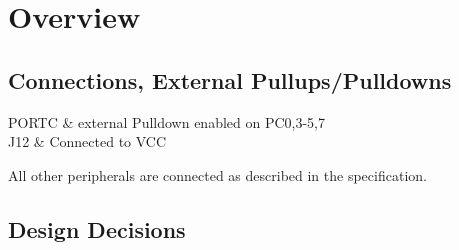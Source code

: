 \documentclass[12pt,a4paper,titlepage,oneside]{article}
\begin{document}
\MakeTitleAndTOC




\section{Overview}

\subsection{Connections,  External Pullups/Pulldowns}

PORTC & external Pulldown enabled on PC0,3-5,7 \\
J12 & Connected to VCC \\
\eConnections

All other peripherals are connected as described in the specification.

\subsection{Design Decisions}
\end{document}
